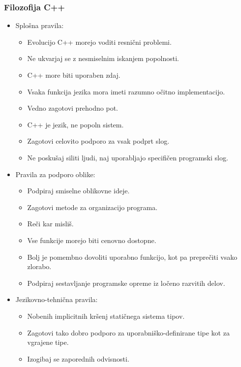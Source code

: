 \documentclass[12pt]{report}
\begin{document}
			\subsubsection{Filozofija C++}
				\begin{itemize}
					\item Splošna pravila:~\cite{cpp_evolution}
					\begin{itemize}
						\item Evolucijo C++ morejo voditi resnični problemi.
						\item Ne ukvarjaj se z nesmiselnim iskanjem popolnosti.
						\item C++ more biti uporaben zdaj.
						\item Vsaka funkcija jezika mora imeti razumno očitno implementacijo.
						\item Vedno zagotovi prehodno pot.
						\item C++ je jezik, ne popoln sistem.
						\item Zagotovi celovito podporo za vsak podprt slog.
						\item Ne poskušaj siliti ljudi, naj uporabljajo specifičen programski slog.
					\end{itemize}
					\item Pravila za podporo oblike:~\cite{cpp_evolution}
					\begin{itemize}
						\item Podpiraj smiselne oblikovne ideje.
						\item Zagotovi metode za organizacijo programa.
						\item Reči kar misliš.
						\item Vse funkcije morejo biti cenovno dostopne.
						\item Bolj je pomembno dovoliti uporabno funkcijo, kot pa preprečiti vsako zlorabo.
						\item Podpiraj sestavljanje programske opreme iz ločeno razvitih delov.
					\end{itemize}
					\item Jezikovno-tehnična pravila:~\cite{cpp_evolution}
					\begin{itemize}
						\item Nobenih implicitnih kršenj statičnega sistema tipov.
						\item Zagotovi tako dobro podporo za uporabniško-definirane tipe kot za vgrajene tipe.
						\item Izogibaj se zaporednih odvisnosti.

\end{itemize}
\end{itemize}
\end{document}
